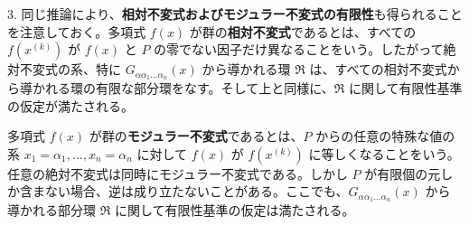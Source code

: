 \documentclass[11pt]{article}
\begin{document}
3. 同じ推論により、\textbf{相対不変式およびモジュラー不変式の有限性}も得られることを注意しておく。多項式 $f(x)$ が群の\textbf{相対不変式}であるとは、すべての $f(x^{(k)})$ が $f(x)$ と $P$ の零でない因子だけ異なることをいう。したがって絶対不変式の系、特に $G_{\alpha\alpha_1\ldots\alpha_n}(x)$ から導かれる環 $\mathfrak R$ は、すべての相対不変式から導かれる環の有限な部分環をなす。そして上と同様に、$\mathfrak R$ に関して有限性基準の仮定が満たされる。

多項式 $f(x)$ が群の\textbf{モジュラー不変式}であるとは、$P$ からの任意の特殊な値の系 $x_1=\alpha_1,\ldots,x_n=\alpha_n$ に対して $f(x)$ が $f(x^{(k)})$ に等しくなることをいう。任意の絶対不変式は同時にモジュラー不変式である。しかし $P$ が有限個の元しか含まない場合、逆は成り立たないことがある。ここでも、$G_{\alpha\alpha_1\ldots\alpha_n}(x)$ から導かれる部分環 $\mathfrak R$ に関して有限性基準の仮定は満たされる。
\end{document}
